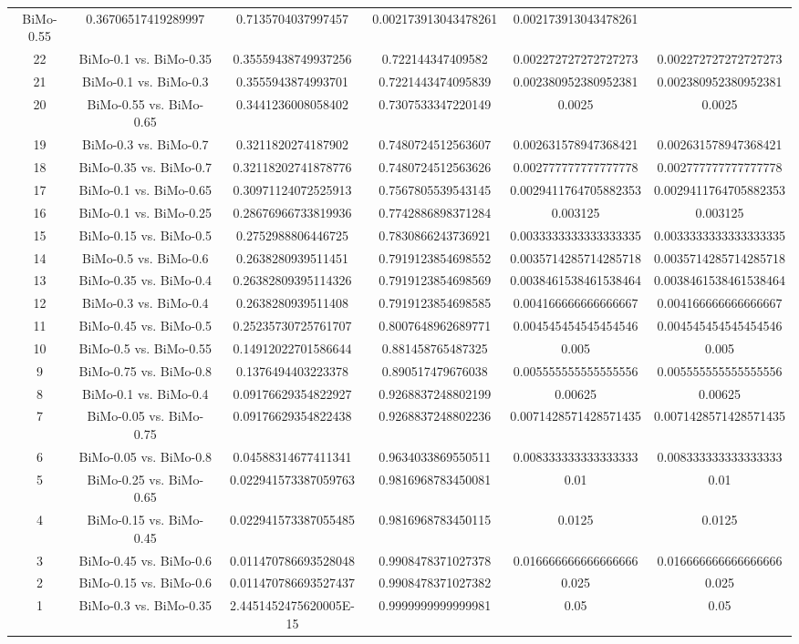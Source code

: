 \documentclass[a4paper,10pt]{article}
\begin{document}
\begin{landscape}
\begin{table}[!htp]
\begin{tabular}{cccccc}
BiMo-0.55&0.36706517419289997&0.7135704037997457&0.002173913043478261&0.002173913043478261\\22&BiMo-0.1 vs. BiMo-0.35&0.35559438749937256&0.722144347409582&0.002272727272727273&0.002272727272727273\\21&BiMo-0.1 vs. BiMo-0.3&0.3555943874993701&0.7221443474095839&0.002380952380952381&0.002380952380952381\\20&BiMo-0.55 vs. BiMo-0.65&0.3441236008058402&0.7307533347220149&0.0025&0.0025\\19&BiMo-0.3 vs. BiMo-0.7&0.3211820274187902&0.7480724512563607&0.002631578947368421&0.002631578947368421\\18&BiMo-0.35 vs. BiMo-0.7&0.32118202741878776&0.7480724512563626&0.002777777777777778&0.002777777777777778\\17&BiMo-0.1 vs. BiMo-0.65&0.30971124072525913&0.7567805539543145&0.0029411764705882353&0.0029411764705882353\\16&BiMo-0.1 vs. BiMo-0.25&0.28676966733819936&0.7742886898371284&0.003125&0.003125\\15&BiMo-0.15 vs. BiMo-0.5&0.2752988806446725&0.7830866243736921&0.0033333333333333335&0.0033333333333333335\\14&BiMo-0.5 vs. BiMo-0.6&0.2638280939511451&0.7919123854698552&0.0035714285714285718&0.0035714285714285718\\13&BiMo-0.35 vs. BiMo-0.4&0.26382809395114326&0.7919123854698569&0.0038461538461538464&0.0038461538461538464\\12&BiMo-0.3 vs. BiMo-0.4&0.2638280939511408&0.7919123854698585&0.004166666666666667&0.004166666666666667\\11&BiMo-0.45 vs. BiMo-0.5&0.25235730725761707&0.8007648962689771&0.004545454545454546&0.004545454545454546\\10&BiMo-0.5 vs. BiMo-0.55&0.14912022701586644&0.881458765487325&0.005&0.005\\9&BiMo-0.75 vs. BiMo-0.8&0.1376494403223378&0.890517479676038&0.005555555555555556&0.005555555555555556\\8&BiMo-0.1 vs. BiMo-0.4&0.09176629354822927&0.9268837248802199&0.00625&0.00625\\7&BiMo-0.05 vs. BiMo-0.75&0.09176629354822438&0.9268837248802236&0.0071428571428571435&0.0071428571428571435\\6&BiMo-0.05 vs. BiMo-0.8&0.04588314677411341&0.9634033869550511&0.008333333333333333&0.008333333333333333\\5&BiMo-0.25 vs. BiMo-0.65&0.022941573387059763&0.9816968783450081&0.01&0.01\\4&BiMo-0.15 vs. BiMo-0.45&0.022941573387055485&0.9816968783450115&0.0125&0.0125\\3&BiMo-0.45 vs. BiMo-0.6&0.011470786693528048&0.9908478371027378&0.016666666666666666&0.016666666666666666\\2&BiMo-0.15 vs. BiMo-0.6&0.011470786693527437&0.9908478371027382&0.025&0.025\\1&BiMo-0.3 vs. BiMo-0.35&2.4451452475620005E-15&0.9999999999999981&0.05&0.05\\\hline

\end{tabular}
\end{table}
\end{landscape}
\end{document}

